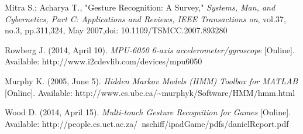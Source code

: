 \documentclass[conference]{IEEEtran}
\begin{document}
\begin{thebibliography}{7}
Mitra S.; Acharya T., "Gesture Recognition: A Survey," \emph{Systems, Man, and Cybernetics, Part C: Applications and Reviews, IEEE Transactions on}, vol.37, no.3, pp.311,324, May 2007,doi: 10.1109/TSMCC.2007.893280



Rowberg J. (2014, April 10). \emph{MPU-6050 6-axis accelerometer/gyroscope} [Online]. Available: http://www.i2cdevlib.com/devices/mpu6050



Murphy K. (2005, June 5). \emph{Hidden Markov Models (HMM) Toolbox for MATLAB} [Online]. Available: http://www.cs.ubc.ca/\~{}murphyk/Software/HMM/hmm.html

Wood D. (2014, April 15). \emph{Multi-touch Gesture Recognition for Games} [Online]. Available: http://people.cs.uct.ac.za/~nschiff/ipadGame/pdfs/danielReport.pdf


\end{thebibliography}
\end{document}
